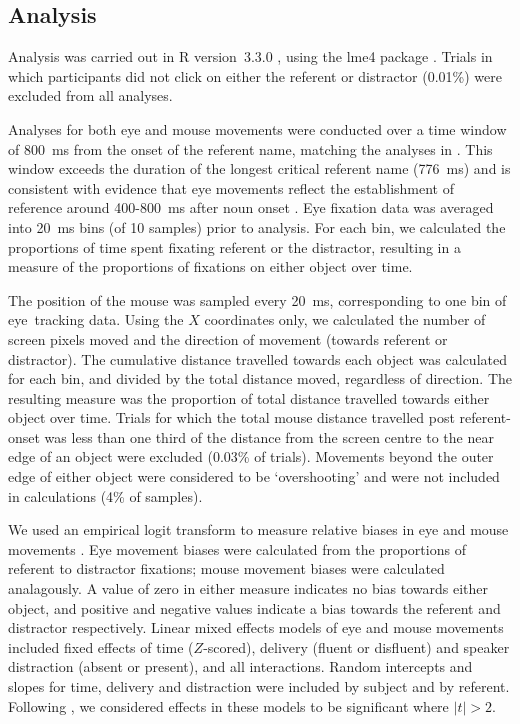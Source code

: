 \documentclass[a4paper,man,natbib]{apa6}
\begin{document}
\subsection{Analysis}
Analysis was carried out in R version~3.3.0 \citep{rbase}, using the lme4 package \citep{lme4}. 
Trials in which participants did not click on either the referent or distractor (0.01\%) were excluded from all analyses. 

Analyses for both eye and mouse movements were conducted over a time window of 800~ms from the onset of the referent name, matching the analyses in \citet{Loy2016}.
This window exceeds the duration of the longest critical referent name (776~ms) and is consistent with evidence that eye movements reflect the establishment of reference around 400-800~ms after noun onset \citep{Eberhard1995}.
Eye fixation data was averaged into 20~ms bins (of 10 samples) prior to analysis.
For each bin, we calculated the proportions of time spent fixating referent or the distractor, resulting in a measure of the proportions of fixations on either object over time.

The position of the mouse was sampled every 20~ms, corresponding to one bin of eye~tracking data.
Using the $X$ coordinates only, we calculated the number of screen pixels moved and the direction of movement (towards referent or distractor).
The cumulative distance travelled towards each object was calculated for each bin, and divided by the total distance moved, regardless of direction.
The resulting measure was the proportion of total distance travelled towards either object over time.
Trials for which the total mouse distance travelled post referent-onset was less than one third of the distance from the screen centre to the near edge of an object were excluded (0.03\% of trials). 
Movements beyond the outer edge of either object were considered to be `overshooting' and were not included in calculations (4\% of samples).

We used an empirical logit transform to measure relative biases in eye and mouse movements \citep{Barr2008}.
Eye movement biases were calculated from the proportions of referent to distractor fixations;
mouse movement biases were calculated analagously.
A value of zero in either measure indicates no bias towards either object, and positive and negative values indicate a bias towards the referent and distractor respectively.
Linear mixed effects models of eye and mouse movements included fixed effects of time ($Z$-scored), delivery (fluent or disfluent) and speaker distraction (absent or present), and all interactions.
Random intercepts and slopes for time, delivery and distraction were included by subject and by referent.
Following \citet{baayen2008analyzing}, we considered effects in these models to be significant where $|t|>2$.
\end{document}
